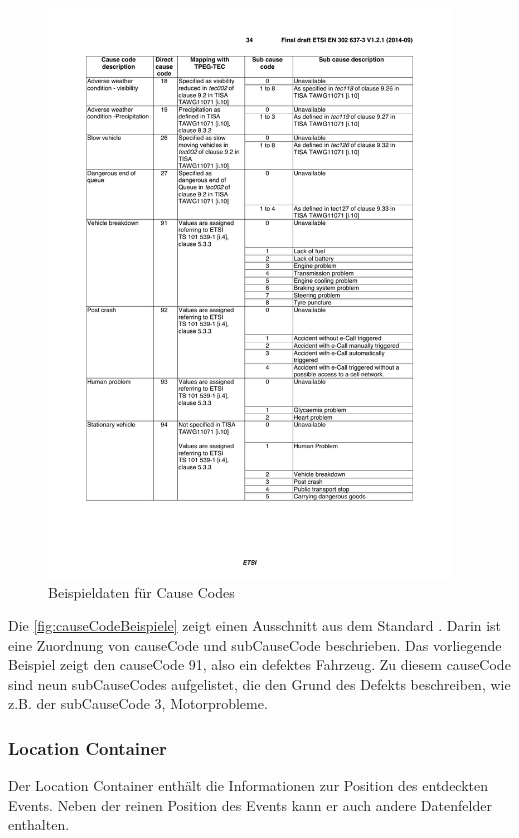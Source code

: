 \begin{figure}[htbp]
	\includegraphics[width=0.95\textwidth]{content/images/04_facilitylayer/denmCauseCodeBeispiel.pdf}
	\caption{Beispieldaten für Cause Codes \cite{en302637-3}}
	\label{fig:causeCodeBeispiele}
\end{figure}


Die \autoref{fig:causeCodeBeispiele} zeigt einen Ausschnitt aus dem Standard   \cite{en302637-3}. Darin ist eine Zuordnung von causeCode und subCauseCode beschrieben. Das vorliegende Beispiel zeigt den causeCode 91, also ein defektes Fahrzeug. Zu diesem causeCode sind neun subCauseCodes aufgelistet, die den Grund des Defekts beschreiben, wie z.B. der subCauseCode 3, Motorprobleme.  

\subsubsection{Location Container}
Der Location Container enthält die Informationen zur Position des entdeckten Events. Neben der reinen Position des Events kann er auch andere Datenfelder enthalten.

